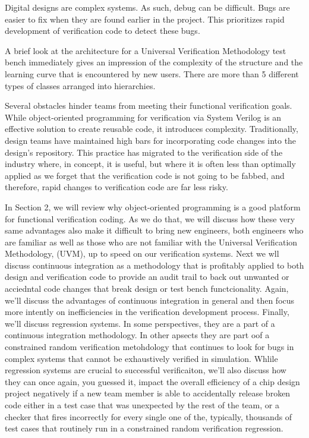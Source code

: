 \documentclass[twocolumn,letterpaper]{IEEEAerospaceCLS}  %
\begin{document}
Digital designs are complex systems. As such, debug can be difficult. Bugs are easier to fix when they are found earlier in the project. This prioritizes rapid development of verification code to detect these bugs.

A brief look at the architecture for a Universal Verification Methodology test bench immediately gives an impression of the complexity of the structure and the learning curve that is encountered by new users. There are more than 5 different types of classes arranged into hierarchies.

Several obstacles hinder teams from meeting their functional verification goals. While object-oriented programming for verification via System Verilog is an effective solution to create reusable code, it introduces complexity. Traditionally, design teams have maintained high bars for incorporating code changes into the design's repository. This practice has migrated to the verification side of the industry where, in concept, it is useful, but where it is often less than optimally applied as we forget that the verification code is not going to be fabbed, and therefore, rapid changes to verification code are far less risky. 

In Section 2, we will review why object-oriented programming is a good platform for functional verification coding. As we do that, we will discuss how these very same advantages also make it difficult to bring new engineers, both engineers who are familiar as well as those who are not familiar with the Universal Verification Methodology, (UVM), up to speed on our verification systems. Next we wll discuss continuous integration as a methodology that is profitably applied to both design and verification code to provide an audit trail to back out unwanted or acciedntal code changes that break design or test bench functcionality. Again, we'll discuss the   advantages of continuous integration in general and then focus more intently on inefficiencies in the verification development process. Finally, we'll discuss regression systems. In some perspectives, they are a part of a continuous integration methodology. In other apsects they are part oof a constrained random verification metohdology that continues to look for bugs in complex systems that cannot be exhaustively verified in simulation. Whlile regression systems are crucial to successful verificaiton, we'll also discuss how they can once again, you guessed it, impact the overall efficiency of a chip design project negatively if a new team member is able to accidentally release broken code either in a test case that was unexpected by the rest of the team, or a checker that fires incorrectly for every single one of the, typically, thousands of test cases that routinely run in a constrained random verification regression.
\end{document}
